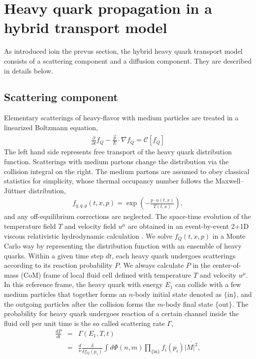 \documentclass[aps, prc, reprint, amsmath, groupedaddress, nofootinbib]{revtex4-1}
\begin{document}
\section{Heavy quark propagation in a hybrid transport model}\label{section:model}
As introduced ioin the prevus section, the hybrid heavy quark transport model consists of a scattering component and a diffusion component.
They are described in details below.
\subsection{Scattering component}
Elementary scatterings of heavy-flavor with medium particles are treated in a linearized Boltzmann equation,
\begin{eqnarray}
  \frac{\partial}{\partial t}f_Q - \frac{\vec{p}}{E}\cdot\nabla f_Q  = 
\mathcal{C}[f_Q]
\end{eqnarray}
The left hand side represents free transport of the heavy quark distribution function. 
Scatterings with medium partons change the distribution via the collision integral on the right.
The medium partons are assumed to obey classical statistics for simplicity, whose thermal occupancy number follows the Maxwell--J\"uttner distribution, 
\begin{eqnarray}
f_{q,\bar{q}, g}(t,x,p) = \exp\left(-\frac{p \cdot u(t,x)}{T(t,x)}\right),
\end{eqnarray}
and any off-equilibrium corrections are neglected.
The space-time evolution of the temperature field $T$ and velocity field $u^\mu$ are obtained in an event-by-event 2+1D viscous relativistic hydrodynamic calculation \cite{Heinz:2005bw,Song:2007ux,Shen:2014vra}.
We solve $f_Q(t,x,p)$ in a Monte Carlo way by representing the distribution function with an ensemble of heavy quarks.
Within a given time step $dt$, each heavy quark undergoes scatterings according to its reaction probability $P$.
We always calculate $P$ in the center-of-mass (CoM) frame of local fluid cell defined with temperature $T$ and velocity $u^\mu$.
In this reference frame, the heavy quark with energy $E_1$ can collide with a few medium particles that together forms an $n$-body initial state denoted as $\{\textrm{in}\}$, and the outgoing particles after the collision forms the $m$-body final state $\{\textrm{out}\}$.
The probability for heavy quark undergoes reaction of a certain channel inside the fluid cell per unit time is the so called scattering rate $\Gamma$,
\begin{eqnarray}\label{eq:rate}
    \frac{dP}{dt} &=& \Gamma(E_1, T, t) \nonumber \\
    &=& \frac{d}{\nu} \frac{\delta}{\delta f_Q(p_1)}\int d\Phi(n,m) \prod_{\textrm{\{in\}}} f_i(p_i) 
\overline{|M|^2},
\end{eqnarray}
\end{document}
